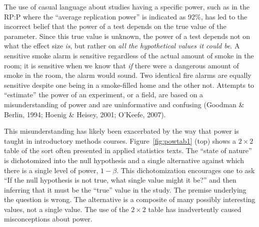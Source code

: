 \documentclass[doc,a4paper,floatsintext,draftfirst]{apa6}
\begin{document}
The use of casual language about studies having a specific power, such as in the RP:P where the ``average replication power'' is indicated as 92\%,  has led to the incorrect belief that the power of a test depends on the true value of the parameter. Since this true value is unknown, the power of a test depends not on what the effect size {\em is}, but rather on {\em all the hypothetical values it could be}. A sensitive smoke alarm is sensitive regardless of the actual amount of smoke in the room; it is sensitive when we know that {\em if} there were a dangerous amount of smoke in the room, the alarm would sound. Two identical fire alarms are equally sensitive despite one being in a smoke-filled home and the other not. Attempts to ``estimate'' the power of an experiment, or a field, are based on a misunderstanding of power and are uninformative and confusing (Goodman \& Berlin, 1994; Hoenig \& Heisey, 2001; O'Keefe, 2007).

\nocite{Hoenig:Heisey:2001,Goodman:Berlin:1994,OKeefe:2007}

This misunderstanding has likely been exacerbated by the way that power is taught in introductory methods courses. Figure~\ref{fig:powtab1} (top) shows a $2\times2$ table of the sort often presented in applied statistics texts. The ``state of nature'' is dichotomized into the null hypothesis and a single alternative against which there is a single level of power, $1-\beta$. This dichotomization encourages one to ask ``If the null hypothesis is not true, what single value might it be?'' and then inferring that it must be the ``true'' value in the study. The premise underlying the question is wrong. The alternative is a composite of many possibly interesting values, not a single value. The use of the $2\times2$ table has inadvertently caused misconceptions about power.
\end{document}
